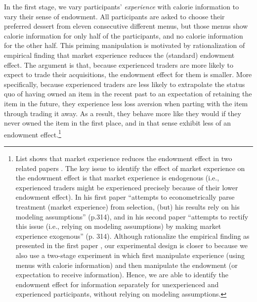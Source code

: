 In the first stage, we vary participants’ \emph{experience} with calorie information to vary their sense of endowment. All participants are asked to choose their preferred dessert from eleven consecutive different menus, but those menus show calorie information for only half of the participants, and no calorie information for the other half. This priming manipulation is motivated by  rationalization of  empirical finding that market experience reduces the (standard) endowment effect. The argument is that, because experienced traders are more likely to expect to trade their acquisitions, the endowment effect for them is smaller. More specifically, because experienced traders are less likely to extrapolate the status quo of having owned an item in the recent past to an expectation of retaining the item in the future, they experience less loss aversion when parting with the item through trading it away. As a result, they behave more like they would if they never owned the item in the first place, and in that sense exhibit less of an endowment effect.\footnote{List shows that market experience reduces the endowment effect in two related papers \citep{listDoesMarketExperience2003, listDoesMarketExperience2011}.
The key issue to identify the effect of market experience on the endowment effect is that market experience is endogenous (i.e., experienced traders might be experienced precisely because of their lower endowment effect). In his first paper \cite{listDoesMarketExperience2003} \enquote{attempts to econometrically parse treatment (market experience) from selection, (but) his results rely on his modeling assumptions} (p.314), and in his second paper \cite{listDoesMarketExperience2011} \enquote{attempts to rectify this issue (i.e., relying on modeling assumptions) by making market experience exogenous} (p. 314). Although \citet{koszegiModelReferenceDependentPreferences2006} rationalize the empirical finding as presented in the first paper \citep{listDoesMarketExperience2003}, our experimental design is closer to \citep{listDoesMarketExperience2011} because we also use a two-stage experiment in which first manipulate experience (using menus with calorie information) and then manipulate the endowment (or expectation to receive information). Hence, we are able to identify the endowment effect for information separately for unexperienced and experienced participants, without relying on modeling assumptions.}


